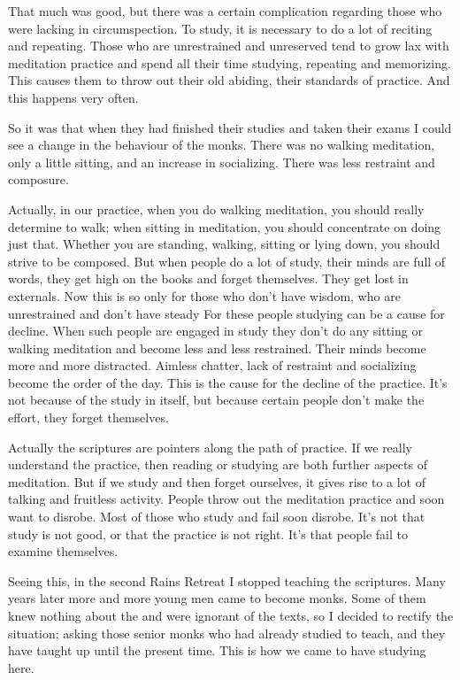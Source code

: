 That much was good, but there was a certain complication regarding those who were lacking in circumspection. To study, it is necessary to do a lot of reciting and repeating. Those who are unrestrained and unreserved tend to grow lax with meditation practice and spend all their time studying, repeating and memorizing. This causes them to throw out their old abiding, their standards of practice. And this happens very often. 

So it was that when they had finished their studies and taken their exams I could see a change in the behaviour of the monks. There was no walking meditation, only a little sitting, and an increase in socializing. There was less restraint and composure. 

Actually, in our practice, when you do walking meditation, you should really determine to walk; when sitting in meditation, you should concentrate on doing just that. Whether you are standing, walking, sitting or lying down, you should strive to be composed. But when people do a lot of study, their minds are full of words, they get high on the books and forget themselves. They get lost in externals. Now this is so only for those who don't have wisdom, who are unrestrained and don't have steady  For these people studying can be a cause for decline. When such people are engaged in study they don't do any sitting or walking meditation and become less and less restrained. Their minds become more and more distracted. Aimless chatter, lack of restraint and socializing become the order of the day. This is the cause for the decline of the practice. It's not because of the study in itself, but because certain people don't make the effort, they forget themselves. 

Actually the scriptures are pointers along the path of practice. If we really understand the practice, then reading or studying are both further aspects of meditation. But if we study and then forget ourselves, it gives rise to a lot of talking and fruitless activity. People throw out the meditation practice and soon want to disrobe. Most of those who study and fail soon disrobe. It's not that study is not good, or that the practice is not right. It's that people fail to examine themselves. 

Seeing this, in the second Rains Retreat I stopped teaching the scriptures. Many years later more and more young men came to become monks. Some of them knew nothing about the  and were ignorant of the texts, so I decided to rectify the situation; asking those senior monks who had already studied to teach, and they have taught up until the present time. This is how we came to have studying here. 

